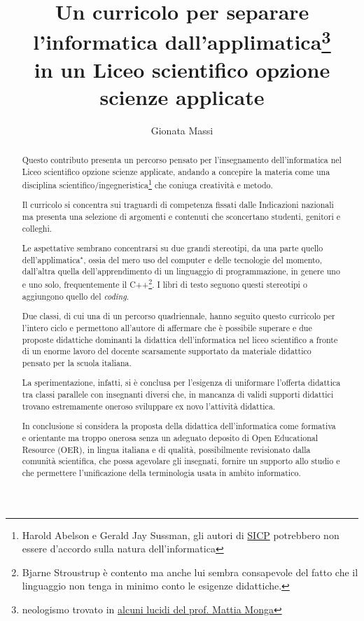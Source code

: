 \documentclass{easychair}
\title{Un curricolo per separare l'informatica dall'applimatica\thanks{neologismo %
trovato in \href{https://aladdin.unimi.it/materiali/talk/2012_mirabilandia.pdf}%
{alcuni lucidi del prof. Mattia Monga}}\\ in un %
Liceo scientifico opzione scienze applicate}
\author{
Gionata Massi\institute{
  IIS Savoia Benincasa, Ancona (AN)
 }
}
\institute{
  IIS Savoia Benincasa, Ancona (AN)\\
  \email{gionata.massi@savoiabenincasa.it}
 }
\begin{document}
\maketitle

\begin{abstract}
Questo contributo presenta un percorso pensato per l'insegnamento dell'informatica
nel Liceo scientifico opzione scienze applicate, andando a concepire la materia come
una disciplina scientifico/ingegneristica\footnote{Harold Abelson e 
Gerald Jay Sussman, gli autori di \href{https://web.mit.edu/6.001/6.037/sicp.pdf}{SICP}
potrebbero non essere d'accordo sulla natura dell'informatica} che coniuga creatività e metodo.

Il curricolo si concentra sui traguardi di competenza fissati dalle Indicazioni
nazionali~\cite{indicazioniNazionali}
ma presenta una selezione di argomenti e contenuti
che sconcertano studenti, genitori e colleghi.

Le aspettative sembrano concentrarsi su due grandi stereotipi,
da una parte quello dell'applimatica$\phantom{}^\star$,
ossia del mero uso del computer e delle tecnologie del momento,
dall'altra quella dell'apprendimento di un linguaggio di programmazione, in genere uno e uno solo,
frequentemente il C++\footnote{Bjarne Stroustrup è contento ma anche lui sembra
consapevole del fatto che il linguaggio non tenga in minimo conto le esigenze didattiche.}.
I libri di testo seguono questi stereotipi o aggiungono quello del \textit{coding}.

Due classi, di cui una di un percorso quadriennale, hanno seguito questo curricolo
per l'intero ciclo e permettono all'autore di affermare che è possibile superare
e due proposte didattiche dominanti la didattica dell'informatica
nel liceo scientifico a fronte di un
enorme lavoro del docente scarsamente supportato da materiale didattico pensato per
la scuola italiana.

La sperimentazione, infatti, si è conclusa per l'esigenza di uniformare l'offerta didattica
tra classi parallele con insegnanti diversi che, in mancanza di validi supporti didattici
trovano estremamente oneroso sviluppare ex novo l'attività didattica.

In conclusione si considera la proposta della didattica dell'informatica come
formativa e orientante ma troppo onerosa senza un adeguato deposito di 
Open Educational Resource (OER), in lingua italiana e di qualità,
possibilmente revisionato dalla comunità scientifica, che possa agevolare
gli insegnati, fornire un supporto allo studio e che permettere l'unificazione
della terminologia usata in ambito informatico.
\end{abstract}
\end{document}
